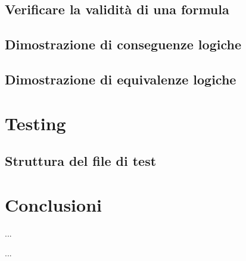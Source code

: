 \documentclass[a4paper,12pt]{report}
\begin{document}
\section{Verificare la validità di una formula}
\section{Dimostrazione di conseguenze logiche}
\section{Dimostrazione di equivalenze logiche}

% 
% 
\chapter{Testing}
\label{testing}

\section{Struttura del file di test}

% 
% 
\chapter{Conclusioni}
\label{conclusion}

%
%
\begin{thebibliography}{00}



%
...
%
%
\end{thebibliography}
% 

%
%
...
\end{document}

